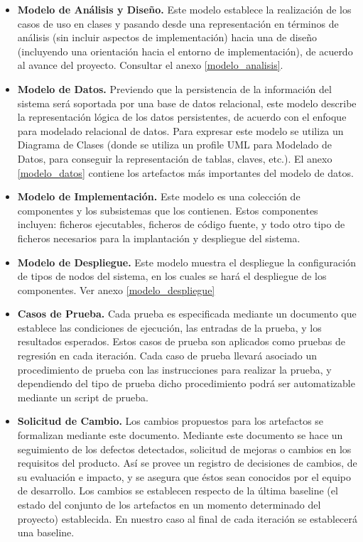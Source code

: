 \begin{itemize}
\item \textbf{Modelo de Análisis y Diseño.} Este modelo establece la realización de los casos de uso en clases y pasando desde una representación en términos de análisis (sin incluir aspectos de implementación) hacia una de diseño (incluyendo una orientación hacia el entorno de implementación), de acuerdo al avance del proyecto.  Consultar el anexo \ref{modelo_analisis}.

\item \textbf{Modelo de Datos.} Previendo que la persistencia de la información del sistema será soportada por una base de datos relacional, este modelo describe la representación lógica de los datos persistentes, de acuerdo con el enfoque para modelado relacional de datos. Para expresar este modelo se utiliza un Diagrama de Clases (donde se utiliza un profile UML para Modelado de Datos, para conseguir la representación de tablas, claves, etc.). El anexo \ref{modelo_datos} contiene los artefactos más importantes del modelo de datos. 

\item \textbf{Modelo de Implementación.} Este modelo es una colección de componentes y los subsistemas que los contienen. Estos componentes incluyen: ficheros ejecutables, ficheros de código fuente, y todo otro tipo de ficheros necesarios para la implantación y despliegue del sistema.

\item \textbf{Modelo de Despliegue.} Este modelo muestra el despliegue la configuración de tipos de nodos del sistema, en los cuales se hará el despliegue de los componentes. Ver anexo \ref{modelo_despliegue} 

\item \textbf{Casos de Prueba.} Cada prueba es especificada mediante un documento que establece las condiciones de ejecución, las entradas de la prueba, y los resultados esperados. Estos casos de prueba son aplicados como pruebas de regresión en cada iteración. Cada caso de prueba llevará asociado un procedimiento de prueba con las instrucciones para realizar la prueba, y dependiendo del tipo de prueba dicho procedimiento podrá ser automatizable mediante un script de prueba. 

\item \textbf{Solicitud de Cambio.} Los cambios propuestos para los artefactos se formalizan mediante este documento. Mediante este documento se hace un seguimiento de los defectos detectados, solicitud de mejoras o cambios en los requisitos del producto. Así se provee un registro de decisiones de cambios, de su evaluación e impacto, y se asegura que éstos sean conocidos por el equipo de desarrollo. Los cambios se establecen respecto de la última baseline (el estado del conjunto de los artefactos en un momento determinado del proyecto) establecida. En nuestro caso al final de cada iteración se establecerá una baseline. 


\end{itemize}
